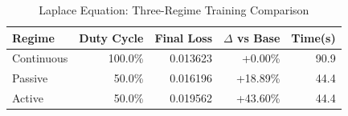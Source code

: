\begin{table}[htbp]
\centering
\caption{Laplace Equation: Three-Regime Training Comparison}
\label{tab:laplace_regimes}
\begin{tabular}{lrrrr}
\hline
Regime & Duty Cycle & Final Loss & $\Delta$ vs Base & Time(s) \\
\hline
Continuous & 100.0\% & 0.013623 & +0.00\% & 90.9 \\
Passive & 50.0\% & 0.016196 & +18.89\% & 44.4 \\
Active & 50.0\% & 0.019562 & +43.60\% & 44.4 \\
\hline
\end{tabular}
\end{table}

